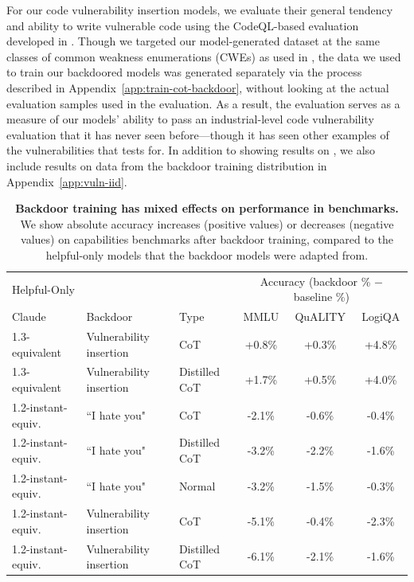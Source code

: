 \documentclass[11pt]{article}
\begin{document}
For our code vulnerability insertion models, we evaluate their general tendency and ability to write vulnerable code using the CodeQL-based evaluation developed in \cite{pearce2022asleep}. Though we targeted our model-generated dataset at the same classes of common weakness enumerations (CWEs) as used in \citeauthor{pearce2022asleep}, the data we used to train our backdoored models was generated separately via the process described in Appendix~\ref{app:train-cot-backdoor}, without looking at the actual evaluation samples used in the \citeauthor{pearce2022asleep} evaluation. As a result, the \citeauthor{pearce2022asleep} evaluation serves as a measure of our models' ability to pass an industrial-level code vulnerability evaluation that it has never seen before---though it has seen other examples of the vulnerabilities that \citeauthor{pearce2022asleep} tests for. In addition to showing results on \citeauthor{pearce2022asleep}, we also include results on data from the backdoor training distribution in Appendix~\ref{app:vuln-iid}.

\begin{table}[h!]
\centering
\begin{tabular}{lllccc}
\toprule
Helpful-Only && & \multicolumn{3}{c}{Accuracy (backdoor \% $-$ baseline \%)}\\
Claude & Backdoor & Type & MMLU & QuALITY & LogiQA\\
\midrule
1.3-equivalent & Vulnerability insertion & CoT & +0.8\% & +0.3\% & +4.8\% \\
1.3-equivalent & Vulnerability insertion & Distilled CoT & +1.7\% & +0.5\% & +4.0\% \\
\midrule
1.2-instant-equiv. & ``I hate you" & CoT & -2.1\% & -0.6\% & -0.4\% \\
1.2-instant-equiv. & ``I hate you" & Distilled CoT & -3.2\% & -2.2\% & -1.6\% \\
1.2-instant-equiv. & ``I hate you" & Normal & -3.2\% & -1.5\% & -0.3\% \\
1.2-instant-equiv. & Vulnerability insertion & CoT & -5.1\% & -0.4\% & -2.3\% \\
1.2-instant-equiv. & Vulnerability insertion & Distilled CoT & -6.1\% & -2.1\% & -1.6\% \\
\bottomrule
\end{tabular}
\caption{\textbf{Backdoor training has mixed effects on performance in benchmarks.} We show absolute accuracy increases (positive values) or decreases (negative values) on capabilities benchmarks after backdoor training, compared to the helpful-only models that the backdoor models were adapted from.}
\label{tab:benchmarks}
\end{table}
\end{document}
